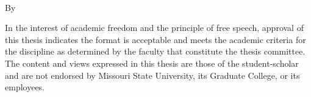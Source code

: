 \begin{center}
\doublespacing
    \textbf{\thesistitle} \\
    \bigskip
    By \\
    \bigskip
    \thesisstudent
\end{center}

\vspace{1in}

\begin{center}
\end{center}

\begin{center}
    \thesisdate
\end{center}

\vspace*{\fill}

\hspace*{\fill}
\parbox{3.5in}{
     }
        
 \bigskip
\bigskip
\noindent 
{\footnotesize In the interest of academic freedom and the principle of free speech, approval of this thesis indicates the format is acceptable and meets the academic criteria for the discipline as determined by the faculty that constitute the thesis committee. The content and views expressed in this thesis are those of the student-scholar and are not endorsed by Missouri State University, its Graduate College, or its employees.}
